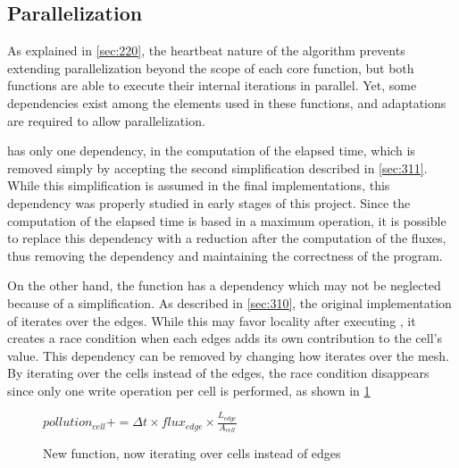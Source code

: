 \subsection{Parallelization}

As explained in \cref{sec:220}, the heartbeat nature of the algorithm prevents extending parallelization beyond the scope of each core function, but both functions are able to execute their internal iterations in parallel. Yet, some dependencies exist among the elements used in these functions, and adaptations are required to allow parallelization.


\computeflux has only one dependency, in the computation of the elapsed time, which is removed simply by accepting the second simplification described in \cref{sec:311}. While this simplification is assumed in the final implementations, this dependency was properly studied in early stages of this project. Since the computation of the elapsed time is based in a maximum operation, it is possible to replace this dependency with a reduction  after the computation of the fluxes, thus removing the dependency and maintaining the correctness of the program.

On the other hand, the \update function has a dependency which may not be neglected because of a simplification. As described in \cref{sec:310}, the original implementation of \update iterates over the edges. While this may favor locality after executing \computeflux, it creates a race condition when each edges adds its own contribution to the cell's value. This dependency can be removed by changing how \update iterates over the mesh. By iterating over the cells instead of the edges, the race condition disappears since only one write operation per cell is performed, as shown in \cref{alg:update2}

\begin{figure}[!htp]
	\begin{alg}

				$pollution_{cell} += \Delta{t} \times flux_{edge} \times \frac{L_{edge}}{A_{cell}}$
			\EndFor
		\EndFor
	\end{alg}

	\caption{New \update function, now iterating over cells instead of edges}
	\label{alg:update2}
\end{figure}
